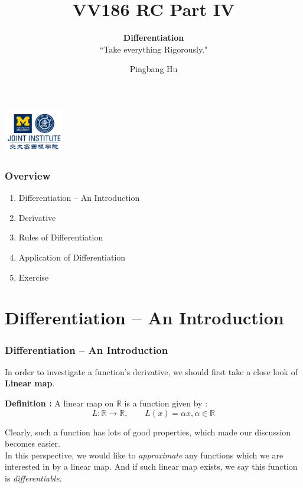 \documentclass[12pt, t]{beamer}
\title{VV186 RC Part IV}
\subtitle{\textbf{Differentiation}\\``Take everything Rigorously."}
\institute[UM-SJTU JI]{University of Michigan-Shanghai Jiao Tong University Joint Institute}
\author{Pingbang Hu}
\renewcommand{\emph}[1]{{\color{Turquoise3}\textsl{#1}}}
\begin{document}
\begin{frame}
    \titlepage
    \begin{center}
        \includegraphics[height=2cm]{Figures/logo/logo2.png}
    \end{center}
\end{frame}

\begin{frame}
    \frametitle{Overview}
    \begin{enumerate}
        \item Differentiation -- An Introduction
        \item Derivative
        \item Rules of Differentiation
        \item Application of Differentiation
        \item Exercise
    \end{enumerate}
\end{frame}

\section{Differentiation -- An Introduction}
\begin{frame}
    \frametitle{Differentiation -- An Introduction}

In order to investigate a function's derivative, we should first take a close look of \textbf{Linear map}.

\vspace{2em}
\textbf{Definition : } A linear map on $\mathbb{R}$ is a function given by :
\begin{equation*}
    L: \mathbb{R}\rightarrow\mathbb{R}, \qquad L(x)=\alpha x, \alpha \in \mathbb{R}
\end{equation*}

\vspace{1em}
Clearly, such a function has lots of good properties, which made our discussion becomes easier.\\
\vspace{1em}
In this perspective, we would like to \emph{approximate} any functions which we are interested in by a linear map. And if 
such linear map exists, we say this function is \emph{differentiable}.
\end{frame}
\end{document}
